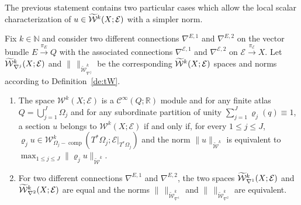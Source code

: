 \documentclass[10pt]{amsart}
\theoremstyle{definition}\newtheorem{defi}[theo]{Definition}\newtheorem{rema}[theo]{Remark}\newtheorem{exam}[theo]{Example}\newtheorem{exem}[theo]{Example}\newtheorem{nota}[theo]{Notation}
\newcommand{\R}{\mathbb{R}}
\newcommand{\N}{\mathbb{N}}
\newcommand{\clW}{\mathcal{W}}
\newcommand{\clC}{\mathcal{C}}
\newcommand{\clE}{\mathcal{E}}
\DeclareMathOperator{\ccomp}{comp}
\let\oldtilde\tilde
\renewcommand*{\tilde}[1]{\mathchoice{\widetilde{#1}}{\widetilde{#1}}{\oldtilde{#1}}{\oldtilde{#1}}}
\begin{document}
The previous statement contains two particular cases which allow the local scalar characterization of $u\in \tilde{\clW}^{k}(X;\clE)$ with a simpler norm.

\begin{prop}\label{pr:Wkred}
Fix $k\in \N$ and consider two different connections $\nabla^{E,1}$ and $\nabla^{E,2}$ on the vector bundle $E\xrightarrow{\pi_{E}} Q$ with the associated connections $\nabla^{\clE,1}$ and $\nabla^{\clE,2}$ on $\clE\xrightarrow{\pi_{\clE}} X$. Let $\tilde{\clW}_{\nabla^{j}}^{k}(X;\clE)$ and $\|\,\|_{\widetilde{\clW}^{k}_{\nabla^{j}}}$ be the corresponding $\tilde{\clW}^{k}(X;\clE)$ spaces and norms according to Definition~\ref{de:tW}.
\begin{enumerate}
\item\label{prop3.2.1} The space $\clW^{k}(X;\clE)$ is a $\clC^{\infty}(Q;\R)$ module and for any finite atlas\linebreak $Q=\bigcup_{j=1}^{J}\Omega_{j}$ and for any subordinate partition of unity $\sum_{j=1}^{J}\varrho_{j}(q)\equiv 1$, a section $u$ belongs to $\clW^{k}(X;\clE)$ if and only if, for every $1\leq j\leq J$,\linebreak $\varrho_{j}u\in \clW^{k}_{\Omega_{j}-\ccomp}(T^{*}\Omega_{j}; \clE|_{T^{*}\Omega_{j}})$ and the norm $\|u\|_{\widetilde{\clW}^{k}}$ is equivalent to\linebreak $\max_{1\leq j\leq J}\|\varrho_{j}u\|_{\widetilde{\clW}^{k}}$.
\item\label{prop3.2.2} For two different connections $\nabla^{E,1}$ and $\nabla^{E,2}$, the two spaces $\tilde{\clW}_{\nabla^{1}}^{k}(X;\clE)$ and $\tilde{\clW}^{k}_{\nabla^{2}}(X;\clE)$ are equal and the norms $\|\,\|_{\widetilde{\clW}^{k}_{\nabla^{1}}}$ and $\|\,\|_{\widetilde{\clW}^{k}_{\nabla^{2}}}$ are equivalent.
\end{enumerate}
\end{prop}
\end{document}
